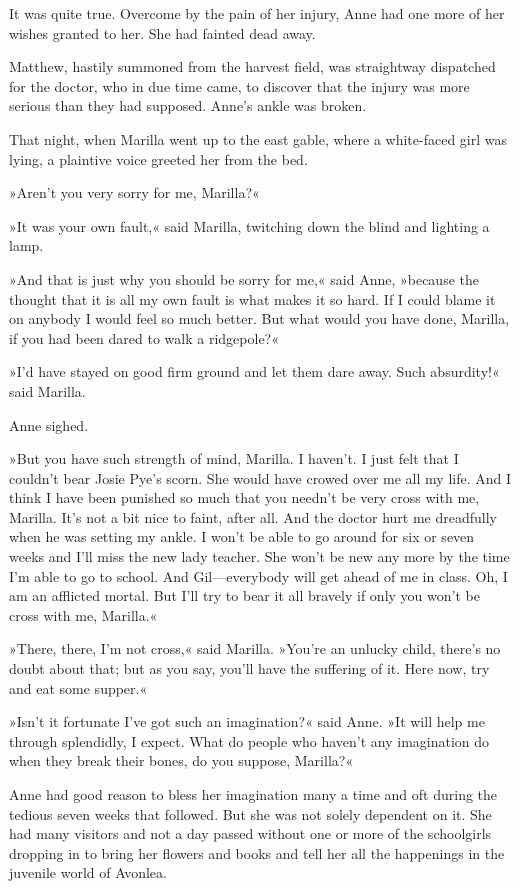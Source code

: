 It was quite true. Overcome by the pain of her injury, Anne had one more of her wishes granted to her. She had fainted dead away.

Matthew, hastily summoned from the harvest field, was straightway dispatched for the doctor, who in due time came, to discover that the injury was more serious than they had supposed. Anne’s ankle was broken.

That night, when Marilla went up to the east gable, where a white-faced girl was lying, a plaintive voice greeted her from the bed.

»Aren’t you very sorry for me, Marilla?«

»It was your own fault,« said Marilla, twitching down the blind and lighting a lamp.

»And that is just why you should be sorry for me,« said Anne, »because the thought that it is all my own fault is what makes it so hard. If I could blame it on anybody I would feel so much better. But what would you have done, Marilla, if you had been dared to walk a ridgepole?«

»I’d have stayed on good firm ground and let them dare away. Such absurdity!« said Marilla.

Anne sighed.

»But you have such strength of mind, Marilla. I haven’t. I just felt that I couldn’t bear Josie Pye’s scorn. She would have crowed over me all my life. And I think I have been punished so much that you needn’t be very cross with me, Marilla. It’s not a bit nice to faint, after all. And the doctor hurt me dreadfully when he was setting my ankle. I won’t be able to go around for six or seven weeks and I’ll miss the new lady teacher. She won’t be new any more by the time I’m able to go to school. And Gil—everybody will get ahead of me in class. Oh, I am an afflicted mortal. But I’ll try to bear it all bravely if only you won’t be cross with me, Marilla.«

»There, there, I’m not cross,« said Marilla. »You’re an unlucky child, there’s no doubt about that; but as you say, you’ll have the suffering of it. Here now, try and eat some supper.«

»Isn’t it fortunate I’ve got such an imagination?« said Anne. »It will help me through splendidly, I expect. What do people who haven’t any imagination do when they break their bones, do you suppose, Marilla?«

Anne had good reason to bless her imagination many a time and oft during the tedious seven weeks that followed. But she was not solely dependent on it. She had many visitors and not a day passed without one or more of the schoolgirls dropping in to bring her flowers and books and tell her all the happenings in the juvenile world of Avonlea.

